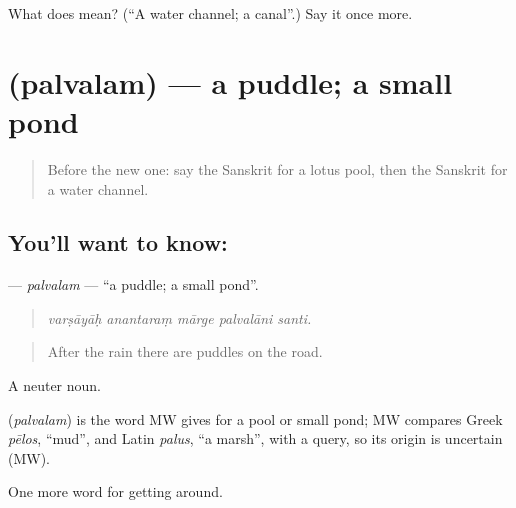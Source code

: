 \begin{tcolorbox}[breakable,colback=teal!4,colframe=teal!35!black,title={Before you move on}]
What does  mean? (\textquotedblleft{}A water channel; a canal\textquotedblright{}.) Say it once more.
\end{tcolorbox}
\section[\texorpdfstring{\sk{पल्वलम्} (palvalam)}{पल्वलम् (palvalam)}]{ (palvalam) — a puddle; a small pond}

\label{lesson:SA-C419-palvalam}



\begin{quote}
Before the new one: say the Sanskrit for a lotus pool, then the Sanskrit for a water channel.
\end{quote}

\subsection*{You'll want to know: }
\textbf{} — \emph{palvalam} — \textquotedblleft{}a puddle; a small pond\textquotedblright{}.

\begin{quote}
    
\end{quote}

\begin{quote}
\emph{varṣāyāḥ anantaraṃ mārge palvalāni santi.}
\end{quote}

\begin{quote}
After the rain there are puddles on the road.
\end{quote}

A neuter noun.

\begin{cousinweb}
\textbf{} (\emph{palvalam}) is the word MW gives for a pool or small pond; MW compares Greek \emph{pēlos}, \textquotedblleft{}mud\textquotedblright{}, and Latin \emph{palus}, \textquotedblleft{}a marsh\textquotedblright{}, with a query, so its origin is uncertain (MW).
\end{cousinweb}

\begin{grammarlens}[title={What you've built}]
One more word for getting around.
\end{grammarlens}

